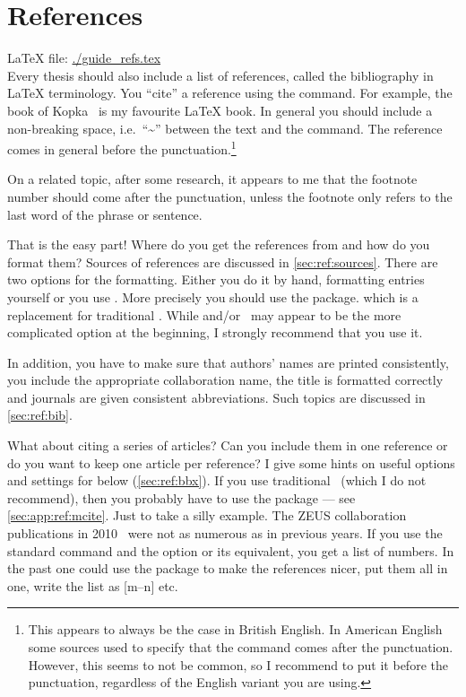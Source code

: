 
\chapter{References}%
\label{sec:ref}

\LaTeX{} file: \url{./guide_refs.tex}\\[1ex]
\noindent
Every thesis should also include a list of references, called the
bibliography in \LaTeX{} terminology. You \enquote{cite} a reference using
the  command. For example, the book of
Kopka~\cite{kopka04} is my favourite \LaTeX{} book. In general you
should include a non-breaking space, i.e.\ \enquote{\textasciitilde} between
the text and the  command.
The reference comes in general before the punctuation.\footnote{%
  This appears to always be the case in British English.
  In American English some sources used to specify that the  command comes after
  the punctuation. However, this seems to not be common, so I recommend to put it before the punctuation,
  regardless of the English variant you are using.}

  On a related topic, after some research, it appears to me that the footnote
number should come after the punctuation, unless the footnote only
refers to the last word of the phrase or sentence.
  
That is the easy part!  Where do you get the references from and how
do you format them? Sources of references are discussed in \cref{sec:ref:sources}.
There are two options for the formatting. Either you do it by
hand, formatting  entries yourself or you use
\BibTeX. 
More precisely you should use the  package.
which is a replacement for traditional \BibTeX.
While  and/or \BibTeX\ may appear to be the more complicated option
at the beginning, I strongly recommend that you use it.

In addition, you have to make sure that authors' names are
printed consistently, you include the appropriate collaboration
name, the title is formatted correctly and journals are given
consistent abbreviations. Such topics are discussed in
\cref{sec:ref:bib}.

What about citing a series of articles? Can you
include them in one reference or do you want to keep one article per
reference?
I give some hints on
useful options and settings for  below (\cref{sec:ref:bbx}).
If you use traditional \BibTeX\ (which I do not recommend),
then you probably have to use the 
package --- see \cref{sec:app:ref:mcite}.
Just to take a silly example. The ZEUS collaboration
publications in
2010~\cite{Abramowicz:2010ih,Abramowicz:2010xc,Abramowicz:2010nj} were
not as numerous as in previous years. If you use the standard
 command and the  option or its equivalent,
you get a list of numbers.
In the past one could use the
 package to make the references nicer, put them all in
one, write the list as [m--n] etc.


